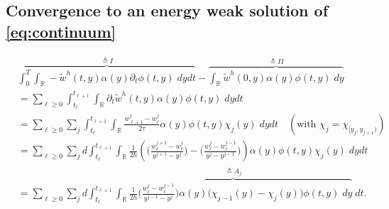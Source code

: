 \documentclass[a4paper,11pt]{article}
\theoremstyle{remark}
\begin{document}

\subsection{Convergence to an energy weak solution of \eqref{eq:continuum}}
\begin{align*}
 &\overbrace{\int_0^T\int_\mathbb{R} -\tilde w^h(t,y) \alpha(y)\partial_t\phi(t,y)\; dy dt}^{\triangleq I} -\overbrace{\int_\mathbb{R} \tilde{w}^h(0,y)\alpha(y)\phi(t,y) \; dy}^{\triangleq II} \\
 &=\sum_{\ell\ge0}\int_{t_\ell}^{t_{\ell+1}}\int_\mathbb{R} \partial_t\tilde w^h(t,y) \alpha(y)\phi(t,y)\; dy dt \\
 &=\sum_{\ell\ge0}\sum_{j}\int_{t_\ell}^{t_{\ell+1}}\int_\mathbb{R} \frac{w^j_{\ell+1}-w^j_{\ell}}{2\tau} \alpha(y)\phi(t,y)\chi_j(y)\; dy dt \quad (\text{with } \chi_j=\chi_{[y_j,y_{j+1})})\\
 &=\sum_{\ell\ge0}\sum_{j}d\int_{t_\ell}^{t_{\ell+1}}\int_\mathbb{R} \tfrac{1}{2h} \left( \Big(\tfrac{w^{j+1}_{\ell} - w^{j}_{\ell}}{y^{j+1}-y^j}\Big) -\Big(\tfrac{w^{j}_{\ell} - w^{j-1}_{\ell}}{y^{j}-y^{j-1}} \Big)\right) \alpha(y)\phi(t,y)\chi_j(y)\; dy dt\\
 &=\sum_{\ell\ge0}\sum_{j}d\int_{t_\ell}^{t_{\ell+1}}\overbrace{\int_\mathbb{R} \tfrac{1}{2h} \Big(\tfrac{w^{j}_{\ell} - w^{j-1}_{\ell}}{y^{j-1}-y^j}\Big)\alpha(y)\big(\chi_{j-1}(y)-\chi_{j}(y)\big) \phi(t,y)\; dy}^{\triangleq A_j} \;dt.
\end{align*}
\end{document}
